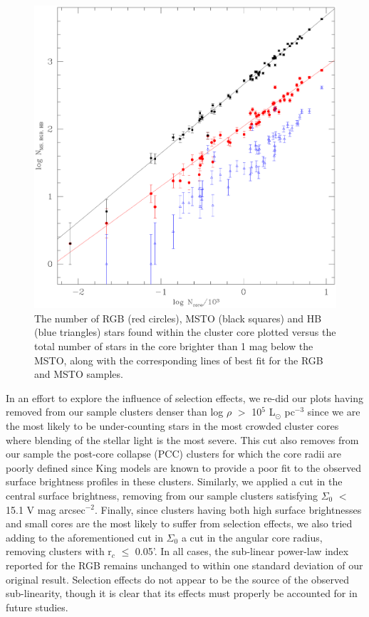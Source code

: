 \begin{figure} [!h]
  \begin{center}
 \includegraphics[scale=0.5]{Chapter-3/fig2.eps}
    \caption[N$_{core}$ versus N$_{MS,RGB,HB}$]{The number of RGB
  (red circles), MSTO (black squares) and HB (blue triangles) stars
  found within the cluster core plotted versus the total number of
  stars in the core brighter than 1 mag below the MSTO, along with the 
  corresponding lines of best fit for the RGB and MSTO samples.
    \label{fig:N_vs_ncore}}
  \end{center}
\end{figure}

In an effort to explore the influence of selection effects, we re-did our
plots having removed from our sample clusters denser than log $\rho$
$>$ 10$^5$ L$_{\odot}$ pc$^{-3}$ since we are the most likely to be
under-counting stars in the most crowded cluster cores where blending
of the stellar light is the most severe.  This cut also removes from
our sample the post-core collapse (PCC) clusters for which the core
radii are poorly defined since King models are known to provide a poor
fit to the observed surface brightness profiles in these clusters.
Similarly, we applied a cut in the central surface brightness,
removing from our sample clusters satisfying $\Sigma_0$ $<$ 15.1 V mag
arcsec$^{-2}$.  Finally, since clusters having both high surface
brightnesses and small cores are the most likely to suffer from
selection effects, we also tried adding to 
the aforementioned cut in $\Sigma_0$ a cut in the angular core radius,
removing clusters with r$_c$ $\le$ 0.05'.  In all cases, the
sub-linear power-law index reported for the RGB remains unchanged to
within one standard deviation of our original result.  Selection 
effects do not appear to be the source of the observed sub-linearity,
though it is clear that its effects must properly be accounted for in
future studies.

